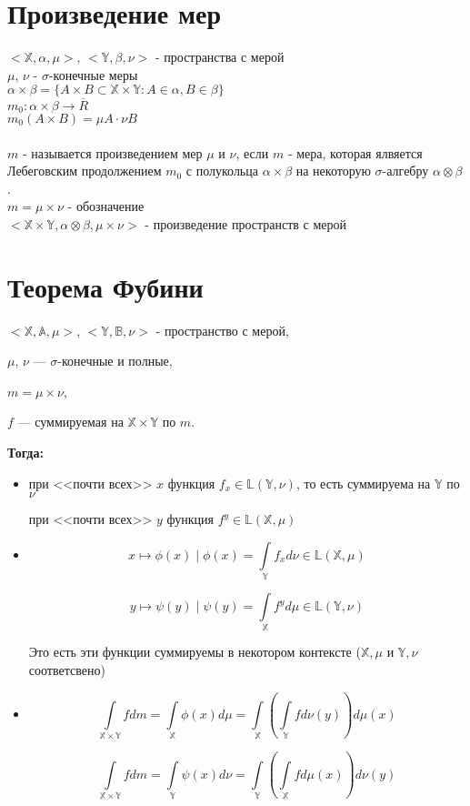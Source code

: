 \documentclass[paper=a4, fontsize=17pt]{article}
\begin{document}
\section{Произведение мер}
$<\mathds{X}, \alpha, \mu>$, $<\mathds{Y}, \beta, \nu>$ - пространства с мерой\\
$\mu$, $\nu$ - $\sigma$-конечные меры\\
$\alpha \times \beta = \{A\times B \subset \mathds{X} \times \mathds{Y} : A \in \alpha, B \in \beta \}$ \\
$m_0 : \alpha \times \beta \rightarrow \overline R$\\ $m_0(A \times B) = \mu A \cdot \nu B$ \\\\
$m$ - называется произведением мер $\mu$ и $\nu$, если $m$ - мера, которая ялвяется Лебеговским продолжением $m_0$ с полукольца $\alpha \times \beta$ на некоторую $\sigma$-алгебру $\alpha \otimes \beta$.\\
$m = \mu \times \nu$ - обозначение \\
$<\mathds{X} \times \mathds{Y}, \alpha \otimes \beta, \mu \times \nu>$ - произведение пространств с мерой

\section{Теорема Фубини}
$<\mathds{X}, \mathds{A}, \mu>$, $<\mathds{Y}, \mathds{B}, \nu>$ - пространство с мерой,

$\mu$, $\nu$ --- $\sigma$-конечные и полные,

$m = \mu \times \nu$,

$f$ --- суммируемая на $\mathds{X} \times \mathds{Y}$ по $m$.

\textbf{Тогда:}
\begin{itemize}
\item
при <<почти всех>> $x$ функция $f_x \in \mathds{L}(\mathds{Y},\nu)$, то есть суммируема на $\mathds{Y}$ по $\nu$

при <<почти всех>> $y$ функция $f^y \in \mathds{L}(\mathds{X},\mu)$

\item
$$x \mapsto \phi(x) \mid \phi(x) = \int\limits_{\mathds{Y}}f_x d\nu \in \mathds{L}(\mathds{X},\mu)$$

$$y \mapsto \psi(y) \mid \psi(y) = \int\limits_{\mathds{X}}f^y d\mu \in \mathds{L}(\mathds{Y},\nu)$$

Это есть эти функции суммируемы в некотором контексте ($\mathds{X},\mu$ и $\mathds{Y},\nu$ соответсвено)

\item
$$\int\limits_{\mathds{X} \times \mathds{Y}} f dm
= \int\limits_{\mathds{X}}\phi(x) d\mu
= \int\limits_{\mathds{X}} (\int\limits_{\mathds{Y}} f d\nu(y)) d\mu(x)$$

$$\int\limits_{\mathds{X} \times \mathds{Y}} f dm
= \int\limits_{\mathds{Y}}\psi(x) d\nu
= \int\limits_{\mathds{Y}} (\int\limits_{\mathds{X}} f d\mu(x)) d\nu(y)$$
\end{itemize}
\end{document}
